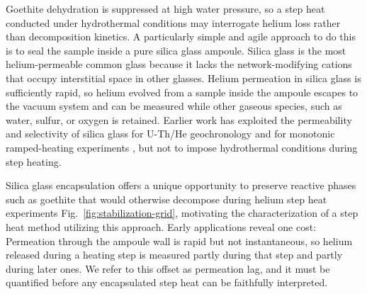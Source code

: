 Goethite dehydration is suppressed at high water pressure, so a step heat conducted under hydrothermal conditions may interrogate helium loss rather than decomposition kinetics. 
A particularly simple and agile approach to do this is to seal the sample inside a pure silica glass ampoule. Silica glass is the most helium-permeable common glass \citep{norton1953,altemose1961} because it lacks the network-modifying cations that occupy interstitial space in other glasses. Helium permeation in silica glass is sufficiently rapid, so helium evolved from a sample inside the ampoule escapes to the vacuum system and can be measured while other gaseous species, such as water, sulfur, or oxygen is retained. Earlier work has exploited the permeability and selectivity of silica glass for U-Th/He geochronology \citep{yakubovich2020,yakubovich2021,yakubovich2024} and for monotonic ramped-heating experiments \citep{yakubovich2019}, but not to impose hydrothermal conditions during step heating. 

Silica glass encapsulation offers a unique opportunity to preserve reactive phases such as goethite that would otherwise decompose during helium step heat experiments Fig.~\ref{fig:stabilization-grid}, motivating the characterization of a step heat method utilizing this approach. Early applications reveal one cost: Permeation through the ampoule wall is rapid but not instantaneous, so helium released during a heating step is measured partly during that step and partly during later ones. We refer to this offset as permeation lag, and it must be quantified before any encapsulated step heat can be faithfully interpreted.


